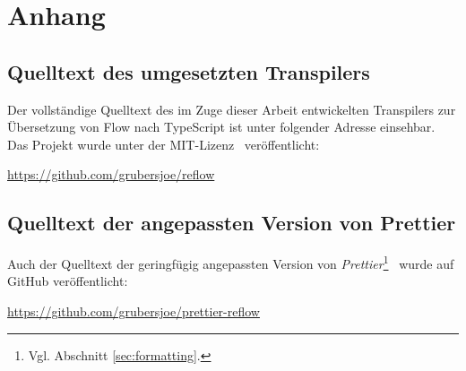 \appendix
\chapter{Anhang}

\section{Quelltext des umgesetzten Transpilers}

Der vollständige Quelltext des im Zuge dieser Arbeit entwickelten Transpilers zur Übersetzung von Flow nach TypeScript ist unter folgender Adresse einsehbar. Das Projekt wurde unter der MIT-Lizenz~\autocite{LICENSE:MIT} veröffentlicht:

\vspace{-0.5\baselineskip}
\url{https://github.com/grubersjoe/reflow}

\section{Quelltext der angepassten Version von Prettier}
\label{appendix:prettier}

Auch der Quelltext der geringfügig angepassten Version von \textit{Prettier}\footnote{Vgl. Abschnitt \ref{sec:formatting}.}~\autocite{SOFTWARE:PRETTIER} wurde auf GitHub veröffentlicht:

\vspace{-0.5\baselineskip}
\url{https://github.com/grubersjoe/prettier-reflow}
